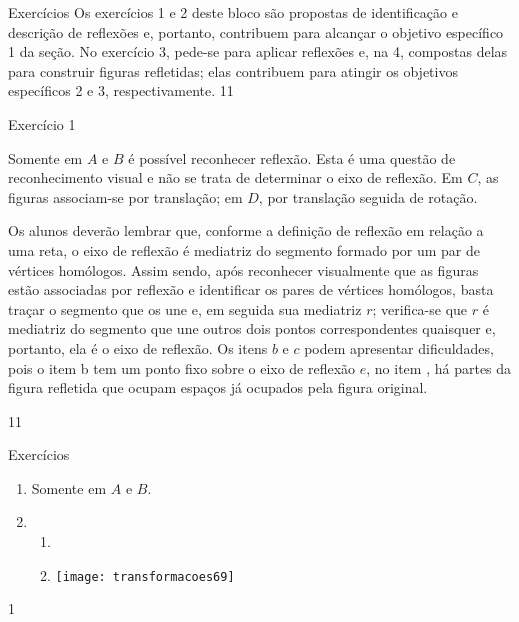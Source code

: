 \clearpage
\def\currentcolor{cor1}
\begin{objectives}{Exercícios}
{
Os exercícios 1 e 2 deste bloco são propostas de identificação e descrição de reflexões e, portanto, contribuem para alcançar o objetivo específico 1 da seção. No exercício 3, pede-se para aplicar reflexões e, na 4, compostas delas para construir figuras refletidas; elas contribuem para atingir os objetivos específicos 2 e 3, respectivamente.   
}{1}{1}
\end{objectives}
\marginpar{\vspace{-2.5em}}
\begin{sugestions}{Exercício 1}
{
Somente em $A$ e $B$ é possível reconhecer reflexão. Esta é uma questão de reconhecimento visual e não se trata de determinar o eixo de reflexão. Em $C$, as figuras associam-se por translação; em $D$, por translação seguida de rotação. 


Os alunos deverão lembrar que, conforme a definição de reflexão em relação a uma reta, o eixo de reflexão é mediatriz do segmento formado por um par de vértices homólogos. Assim sendo, após reconhecer visualmente que as figuras estão associadas por reflexão e identificar os pares de vértices homólogos,  basta traçar o segmento que os une e, em seguida sua mediatriz $r$; verifica-se que $r$ é mediatriz do segmento que une outros dois pontos correspondentes quaisquer e, portanto, ela é o eixo de reflexão. Os itens $b$ e $c$ podem apresentar dificuldades, pois o item b tem um ponto fixo sobre o eixo de reflexão $e$, no item , há partes da figura refletida que ocupam espaços já ocupados pela figura original.
}{1}{1}
\end{sugestions}
\begin{answer}{Exercícios}
{\exerciselist
\begin{enumerate}
\item Somente em $A$ e $B$.
\item 
\begin{enumerate}

\item\item[] 
{
\texttt{[image: transformacoes69]}
}
\end{enumerate}
\end{enumerate}
}{1}
\end{answer}

